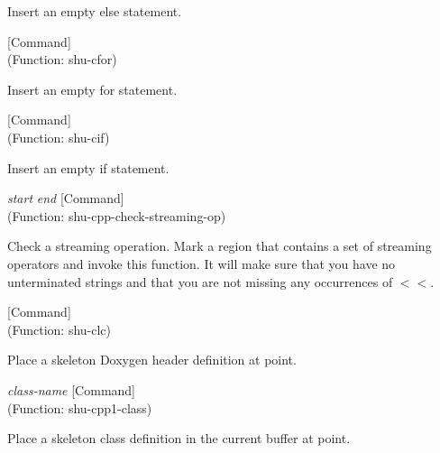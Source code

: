 \begin{doc-string}
Insert an empty else statement.
\end{doc-string}

\vspace{1em}
\noindent
{}
\usebox{\funcname}
 \hfill [Command]\\%
 (Function: shu-cfor)

\begin{doc-string}
Insert an empty for statement.
\end{doc-string}

\vspace{1em}
\noindent
{}
\usebox{\funcname}
 \hfill [Command]\\%
 (Function: shu-cif)

\begin{doc-string}
Insert an empty if statement.
\end{doc-string}

\vspace{1em}
\noindent
{}
\usebox{\funcname}\emph{start} \emph{end}
 \hfill [Command]\\%
 (Function: shu-cpp-check-streaming-op)

\begin{doc-string}
Check a streaming operation.   Mark a region that contains a set of streaming
operators and invoke this function.  It will make sure that you have no unterminated
strings and that you are not missing any occurrences of $<$$<$.
\end{doc-string}

\vspace{1em}
\noindent
{}
\usebox{\funcname}
 \hfill [Command]\\%
 (Function: shu-clc)

\begin{doc-string}
Place a skeleton Doxygen header definition at point.
\end{doc-string}

\vspace{1em}
\noindent
{}
\usebox{\funcname}\emph{class-name}
 \hfill [Command]\\%
 (Function: shu-cpp1-class)

\begin{doc-string}
Place a skeleton class definition in the current buffer at point.
\end{doc-string}

